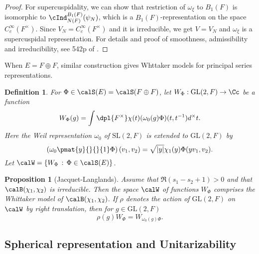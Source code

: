 \documentclass{article}
\newtheorem{definition}{Definition}[section]
\newcommand{\GL}{\mathrm{GL}}
\newcommand{\SL}{\mathrm{SL}}
\newtheorem{proposition}{Proposition}[section]
\begin{document}
\begin{proof}
For supercuspidality, we can show that restriction of $\omega_{\xi}$ to $B_{1}(F)$ is isomorphic to $\cInd_{N(F)}^{B_{1}(F)}(\psi_{N})$, which is a $B_{1}(F)$-representation on the space $C_{c}^{\infty}(F^{\times})$. Since $V_N = C_{c}^{\infty}(F^{\times})$ and it is irreducible, we get $V = V_N$ and $\omega_{\xi}$ is a supercuspidal representation. 
For details and proof of smoothness, admissibility and irreducibility, see 542p of \cite{bu}. 
\end{proof}
When $E = F\oplus F$, similar construction gives Whttaker models for principal series representations. 
\begin{definition}
For $\Phi\in\calS(E) = \calS(F\oplus F)$, let $W_{\Phi}:\GL(2, F)\to \Cc$ be a function
$$
W_{\Phi}(g) = \int\dpl{F^{\times}} \chi(t) (\omega_0(g)\Phi)(t, t^{-1}) d^{\times}t.
$$
Here the Weil representation $\omega_0$ of $\SL(2, F)$ is extended to $\GL(2, F)$ by 
$$
\left(\omega_{0}\pmat{y}{}{}{1}\Phi\right)(v_1, v_2) = \sqrt{|y|}\chi_1(y)\Phi(yv_1, v_2).
$$
Let $\calW = \{W_{\Phi}\,:\, \Phi\in\calS(E)\}$. 
\end{definition}
\begin{proposition}[Jacquet-Langlands]
Assume that $\Re(s_1 - s_2 + 1)>0$ and that $\calB(\chi_1, \chi_2)$ is irreducible. 
Then the space $\calW$ of functions $W_{\Phi}$ comprises the Whittaker model of $\calB(\chi_1, \chi_2)$.
If $\rho$ denotes the action of $\GL(2, F)$ on $\calW$ by right translation, then for $g\in \GL(2, F)$ 
$$
\rho(g)W_{\Phi} = W_{\omega_0(g)\Phi}. 
$$
\end{proposition}

\subsection{Spherical representation and Unitarizability}
\end{document}
